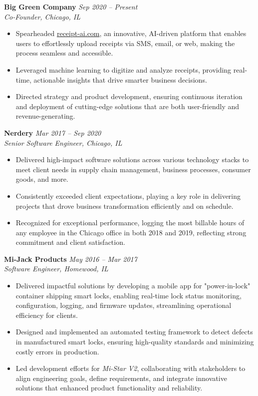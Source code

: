 \documentclass[letterpaper,10pt]{article}
\begin{document}
\textbf{Big Green Company} \hfill \textit{Sep 2020 -- Present}\\
\emph{Co-Founder, Chicago, IL}\\
\begin{itemize}
    \item Spearheaded \href{https://receipt-ai.com}{receipt-ai.com}, an innovative, AI-driven platform that enables users to effortlessly upload receipts via SMS, email, or web, making the process seamless and accessible.
    \item Leveraged machine learning to digitize and analyze receipts, providing real-time, actionable insights that drive smarter business decisions.
    \item Directed strategy and product development, ensuring continuous iteration and deployment of cutting-edge solutions that are both user-friendly and revenue-generating.
\end{itemize}

\textbf{Nerdery} \hfill \textit{Mar 2017 -- Sep 2020}\\
\emph{Senior Software Engineer, Chicago, IL}\\
\begin{itemize}
  \item Delivered high-impact software solutions across various technology stacks to meet client needs in supply chain management, business processes, consumer goods, and more.
  \item Consistently exceeded client expectations, playing a key role in delivering projects that drove business transformation efficiently and on schedule.
  \item Recognized for exceptional performance, logging the most billable hours of any employee in the Chicago office in both 2018 and 2019, reflecting strong commitment and client satisfaction.
\end{itemize}

\textbf{Mi-Jack Products} \hfill \textit{May 2016 -- Mar 2017}\\
\emph{Software Engineer, Homewood, IL}\\
\begin{itemize}
  \item Delivered impactful solutions by developing a mobile app for "power-in-lock" container shipping smart locks, enabling real-time lock status monitoring, configuration, logging, and firmware updates, streamlining operational efficiency for clients.
  \item Designed and implemented an automated testing framework to detect defects in manufactured smart locks, ensuring high-quality standards and minimizing costly errors in production.
  \item Led development efforts for \emph{Mi-Star V2}, collaborating with stakeholders to align engineering goals, define requirements, and integrate innovative solutions that enhanced product functionality and reliability.
\end{itemize}
\end{document}
